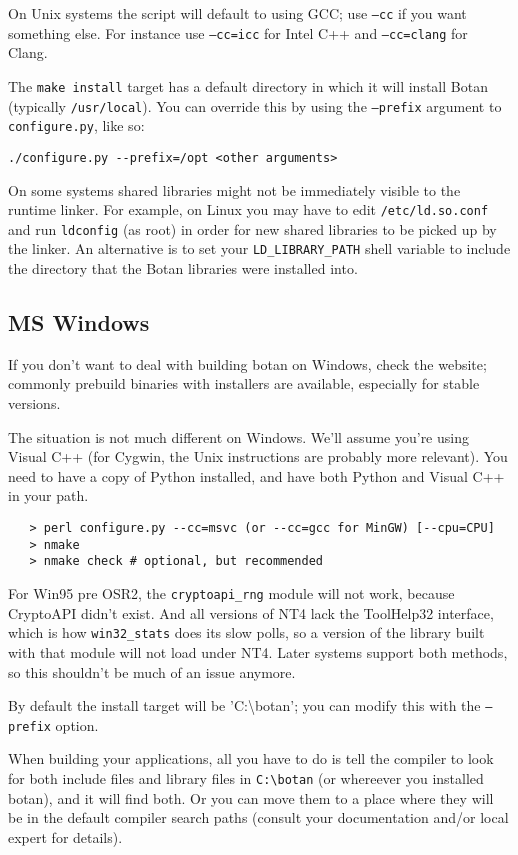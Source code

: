 \documentclass{article}
\newcommand{\filename}[1]{\texttt{#1}}
\begin{document}
On Unix systems the script will default to using GCC; use
\texttt{--cc} if you want something else. For instance use
\texttt{--cc=icc} for Intel C++ and \texttt{--cc=clang} for Clang.

The \verb|make install| target has a default directory in which it
will install Botan (typically \verb|/usr/local|). You can override
this by using the \texttt{--prefix} argument to
\filename{configure.py}, like so:

\verb|./configure.py --prefix=/opt <other arguments>|

On some systems shared libraries might not be immediately visible to
the runtime linker. For example, on Linux you may have to edit
\filename{/etc/ld.so.conf} and run \texttt{ldconfig} (as root) in
order for new shared libraries to be picked up by the linker. An
alternative is to set your \texttt{LD\_LIBRARY\_PATH} shell variable
to include the directory that the Botan libraries were installed into.

\subsection{MS Windows}

If you don't want to deal with building botan on Windows, check the
website; commonly prebuild binaries with installers are available,
especially for stable versions.

The situation is not much different on Windows. We'll assume you're
using Visual C++ (for Cygwin, the Unix instructions are probably more
relevant). You need to have a copy of Python installed, and have both
Python and Visual C++ in your path.

\begin{verbatim}
   > perl configure.py --cc=msvc (or --cc=gcc for MinGW) [--cpu=CPU]
   > nmake
   > nmake check # optional, but recommended
\end{verbatim}

For Win95 pre OSR2, the \verb|cryptoapi_rng| module will not work,
because CryptoAPI didn't exist. And all versions of NT4 lack the
ToolHelp32 interface, which is how \verb|win32_stats| does its slow
polls, so a version of the library built with that module will not
load under NT4. Later systems support both methods, so this shouldn't
be much of an issue anymore.

By default the install target will be 'C:\textbackslash botan'; you
can modify this with the \texttt{--prefix} option.

When building your applications, all you have to do is tell the
compiler to look for both include files and library files in
\verb|C:\botan| (or whereever you installed botan), and it will find
both. Or you can move them to a place where they will be in the
default compiler search paths (consult your documentation and/or local
expert for details).
\end{document}
